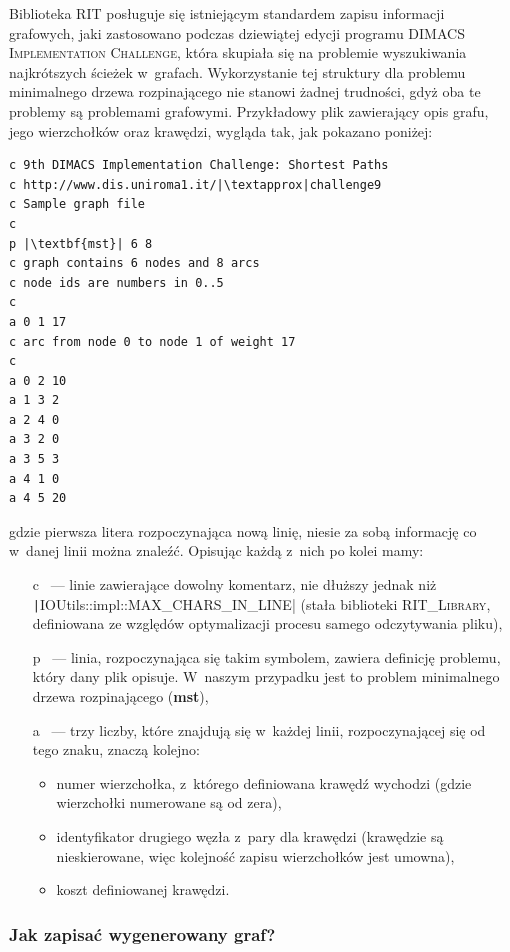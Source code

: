 Biblioteka \textsc{RIT} posługuje się istniejącym standardem zapisu informacji grafowych, jaki zastosowano podczas dziewiątej edycji programu \textsc{DIMACS Implementation Challenge}, która skupiała się na problemie wyszukiwania najkrótszych ścieżek w~grafach. 
Wykorzystanie tej struktury dla problemu minimalnego drzewa rozpinającego nie stanowi żadnej trudności, gdyż oba te problemy są problemami grafowymi.
Przykładowy plik zawierający opis grafu, jego wierzchołków oraz krawędzi, wygląda tak, jak pokazano poniżej:

\begin{verbatim}
c 9th DIMACS Implementation Challenge: Shortest Paths
c http://www.dis.uniroma1.it/|\textapprox|challenge9
c Sample graph file
c
p |\textbf{mst}| 6 8
c graph contains 6 nodes and 8 arcs
c node ids are numbers in 0..5
c
a 0 1 17
c arc from node 0 to node 1 of weight 17
c
a 0 2 10
a 1 3 2
a 2 4 0
a 3 2 0
a 3 5 3
a 4 1 0
a 4 5 20
\end{verbatim}
gdzie pierwsza litera rozpoczynająca nową linię, niesie za sobą informację co w~danej linii można znaleźć.
Opisując każdą z~nich po kolei mamy:

\begin{itemize}
	\item[c]~--- linie zawierające dowolny komentarz, nie dłuższy jednak niż \texttt|IOUtils::impl::MAX_CHARS_IN_LINE| (stała biblioteki \textsc{RIT\_Library}, definiowana ze względów optymalizacji procesu samego odczytywania pliku),
	\item[p]~--- linia, rozpoczynająca się takim symbolem, zawiera definicję problemu, który dany plik opisuje. W~naszym przypadku jest to problem minimalnego drzewa rozpinającego (\textbf{mst}),
	\item[a]~--- trzy liczby, które znajdują się w~każdej linii, rozpoczynającej się od tego znaku, znaczą kolejno:
	\begin{itemize}
		\item numer wierzchołka, z~którego definiowana krawędź wychodzi (gdzie wierzchołki numerowane są od zera),
		\item identyfikator drugiego węzła z~pary dla krawędzi (krawędzie są nieskierowane, więc kolejność zapisu wierzchołków jest umowna),
		\item koszt definiowanej krawędzi.
	\end{itemize}
\end{itemize}


\subsubsection{Jak zapisać wygenerowany graf?}


